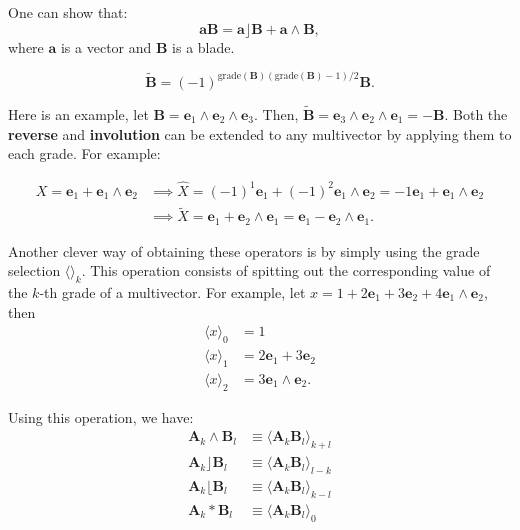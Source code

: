One can show that:
\begin{displaymath}
    \mathbf{a B} = \mathbf a \rfloor \mathbf B + \mathbf a \wedge \mathbf B,
\end{displaymath}
where $\mathbf a$ is a vector and $\mathbf B$ is a blade.


\begin{definition}
    \begin{displaymath}
        \tilde{\mathbf B} = (-1) ^{\text{grade}(\mathbf B)(\text{grade}(\mathbf B)-1)/2} \mathbf B.
    \end{displaymath}
\end{definition}
Here is an example, let $\mathbf B = \mathbf e_1 \wedge \mathbf e_2 \wedge \mathbf e_3$. Then,
$\tilde{\mathbf B} = \mathbf e_3 \wedge \mathbf e_2 \wedge \mathbf e_1 = -\mathbf B$.
Both the \textbf{reverse} and \textbf{involution} can be extended to any multivector by applying them to each grade. For example:

\begin{align*}
    X = \mathbf e_1 + \mathbf e_1 \wedge \mathbf e_2 & \implies
    \hat{X} = (-1)^1 \mathbf e_1 + (-1)^{2} \mathbf e_1 \wedge \mathbf e_2 = -1 \mathbf e_1 +  \mathbf e_1 \wedge \mathbf e_2
    \\
    & \implies
    \tilde{X} = \mathbf e_1 + \mathbf e_2 \wedge \mathbf e_1 = \mathbf e_1 - \mathbf e_2 \wedge \mathbf e_1.
\end{align*}

Another clever way of obtaining these operators is by simply using the grade selection $\langle \rangle_k$. This
operation consists of spitting out the corresponding value of the $k$-th grade of a multivector. For example,
let $x = 1 + 2 \mathbf e_1 + 3 \mathbf e_2 + 4 \mathbf e_1 \wedge \mathbf e_2$, then
\begin{align*}
    \langle x \rangle_0 &= 1 \\
    \langle x \rangle_1 &= 2 \mathbf e_1 + 3 \mathbf e_2 \\
    \langle x \rangle_2 &= 3 \mathbf e_1 \wedge \mathbf e_2.
\end{align*}  

Using this operation, we have:
\begin{align*}
    \mathbf A_k \wedge \mathbf B_l  &\equiv \langle \mathbf A_k \mathbf B_l \rangle_{k+l}\\
    \mathbf A_k \rfloor \mathbf B_l &\equiv \langle \mathbf A_k \mathbf B_l \rangle_{l-k}\\
    \mathbf A_k \lfloor \mathbf B_l &\equiv \langle \mathbf A_k \mathbf B_l \rangle_{k-l}\\
    \mathbf A_k * \mathbf B_l       &\equiv \langle \mathbf A_k \mathbf B_l \rangle_{0}
\end{align*}

